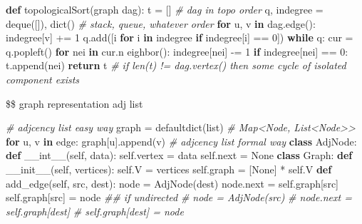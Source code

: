 \documentclass[
]{article}
\newenvironment{Shaded}{}{}
\newcommand{\BuiltInTok}[1]{#1}
\newcommand{\CommentTok}[1]{\textcolor[rgb]{0.38,0.63,0.69}{\textit{#1}}}
\newcommand{\ControlFlowTok}[1]{\textcolor[rgb]{0.00,0.44,0.13}{\textbf{#1}}}
\newcommand{\DecValTok}[1]{\textcolor[rgb]{0.25,0.63,0.44}{#1}}
\newcommand{\FunctionTok}[1]{\textcolor[rgb]{0.02,0.16,0.49}{#1}}
\newcommand{\KeywordTok}[1]{\textcolor[rgb]{0.00,0.44,0.13}{\textbf{#1}}}
\newcommand{\NormalTok}[1]{#1}
\newcommand{\OperatorTok}[1]{\textcolor[rgb]{0.40,0.40,0.40}{#1}}
\newcommand{\VariableTok}[1]{\textcolor[rgb]{0.10,0.09,0.49}{#1}}
\begin{document}
\begin{Shaded}
\begin{Highlighting}[]
\KeywordTok{def}\NormalTok{ topologicalSort(graph dag):}
\NormalTok{    t }\OperatorTok{=}\NormalTok{ []  }\CommentTok{\# dag in topo order}
\NormalTok{    q, indegree }\OperatorTok{=}\NormalTok{ deque([]), }\BuiltInTok{dict}\NormalTok{()  }\CommentTok{\# stack, queue, whatever order}
    \ControlFlowTok{for}\NormalTok{ u, v }\KeywordTok{in}\NormalTok{ dag.edge():}
\NormalTok{    	indegree[v] }\OperatorTok{+=} \DecValTok{1}
\NormalTok{    q.add([i }\ControlFlowTok{for}\NormalTok{ i }\KeywordTok{in}\NormalTok{ indegree }\ControlFlowTok{if}\NormalTok{ indegree[i] }\OperatorTok{==} \DecValTok{0}\NormalTok{])}
    \ControlFlowTok{while}\NormalTok{ q:}
\NormalTok{        cur }\OperatorTok{=}\NormalTok{ q.popleft()}
        \ControlFlowTok{for}\NormalTok{ nei }\KeywordTok{in}\NormalTok{ cur.n eighbor():}
\NormalTok{            indegree[nei] }\OperatorTok{{-}=} \DecValTok{1}
            \ControlFlowTok{if}\NormalTok{ indegree[nei] }\OperatorTok{==} \DecValTok{0}\NormalTok{:}
\NormalTok{            	t.append(nei)}
	\ControlFlowTok{return}\NormalTok{ t  }\CommentTok{\# if len(t) != dag.vertex() then some cycle of isolated component exists}
\end{Highlighting}
\end{Shaded}

\$\$ graph representation adj list

\begin{Shaded}
\begin{Highlighting}[]
\CommentTok{\# adjcency list easy way}
\NormalTok{graph }\OperatorTok{=}\NormalTok{ defaultdict(}\BuiltInTok{list}\NormalTok{)  }\CommentTok{\# Map\textless{}Node, List\textless{}Node\textgreater{}\textgreater{}}
\ControlFlowTok{for}\NormalTok{ u, v }\KeywordTok{in}\NormalTok{ edge:}
\NormalTok{    graph[u].append(v)}
\CommentTok{\# adjcency list formal way}
\KeywordTok{class}\NormalTok{ AdjNode:}
    \KeywordTok{def} \FunctionTok{\_\_int\_\_}\NormalTok{(}\VariableTok{self}\NormalTok{, data):}
        \VariableTok{self}\NormalTok{.vertex }\OperatorTok{=}\NormalTok{ data}
        \VariableTok{self}\NormalTok{.}\BuiltInTok{next} \OperatorTok{=} \VariableTok{None}
\KeywordTok{class}\NormalTok{ Graph:}
    \KeywordTok{def} \FunctionTok{\_\_init\_\_}\NormalTok{(}\VariableTok{self}\NormalTok{, vertices):}
        \VariableTok{self}\NormalTok{.V }\OperatorTok{=}\NormalTok{ vertices}
        \VariableTok{self}\NormalTok{.graph }\OperatorTok{=}\NormalTok{ [}\VariableTok{None}\NormalTok{] }\OperatorTok{*} \VariableTok{self}\NormalTok{.V}
    \KeywordTok{def}\NormalTok{ add\_edge(}\VariableTok{self}\NormalTok{, src, dest):}
\NormalTok{        node }\OperatorTok{=}\NormalTok{ AdjNode(dest)}
\NormalTok{        node.}\BuiltInTok{next} \OperatorTok{=} \VariableTok{self}\NormalTok{.graph[src]}
        \VariableTok{self}\NormalTok{.graph[src] }\OperatorTok{=}\NormalTok{ node}
        \CommentTok{\#\# if undirected         }
        \CommentTok{\# node = AdjNode(src) }
        \CommentTok{\# node.next = self.graph[dest] }
        \CommentTok{\# self.graph[dest] = node }
\end{Highlighting}
\end{Shaded}
\end{document}
